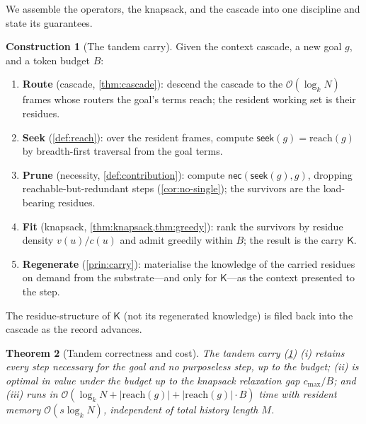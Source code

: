 \documentclass[11pt,twocolumn,a4paper]{article}
\theoremstyle{thmstyle}
\newtheorem{theorem}{Theorem}[section]
\theoremstyle{definition}
\newtheorem{construction}[theorem]{Construction}
\theoremstyle{remark}
\newcommand{\goal}{g}                   %
\newcommand{\reach}{\mathrm{reach}}
\newcommand{\keep}{\mathsf{K}}
\newcommand{\budget}{B}
\newcommand{\seek}{\textsf{seek}}
\newcommand{\nec}{\textsf{nec}}
\newcommand{\val}{v}                    %
\newcommand{\cost}{c}                   %
\newcommand{\abs}[1]{\lvert#1\rvert}
\begin{document}
We assemble the operators, the knapsack, and the cascade into one discipline and
state its guarantees.

\begin{construction}[The tandem carry]
\label{con:tandem}
Given the context cascade, a new goal $\goal$, and a token budget $\budget$:
\begin{enumerate}[leftmargin=1.8em,itemsep=1pt]
\item \textbf{Route} (cascade, \cref{thm:cascade}): descend the cascade to the
$\mathcal{O}(\log_k N)$ frames whose routers the goal's terms reach; the resident
working set is their residues.
\item \textbf{Seek} (\cref{def:reach}): over the resident frames, compute
$\seek(\goal)=\reach(\goal)$ by breadth-first traversal from the goal terms.
\item \textbf{Prune} (necessity, \cref{def:contribution}): compute
$\nec(\seek(\goal),\goal)$, dropping reachable-but-redundant steps
(\cref{cor:no-single}); the survivors are the load-bearing residues.
\item \textbf{Fit} (knapsack, \cref{thm:knapsack,thm:greedy}): rank the survivors
by residue density $\val(u)/\cost(u)$ and admit greedily within $\budget$; the
result is the carry $\keep$.
\item \textbf{Regenerate} (\cref{prin:carry}): materialise the knowledge of the
carried residues on demand from the substrate---and only for $\keep$---as the
context presented to the step.
\end{enumerate}
The residue-structure of $\keep$ (not its regenerated knowledge) is filed back
into the cascade as the record advances.
\end{construction}

\begin{theorem}[Tandem correctness and cost]
\label{thm:tandem}
The tandem carry (\cref{con:tandem}) (i) retains every step necessary for the
goal and no purposeless step, up to the budget; (ii) is optimal in value under
the budget up to the knapsack relaxation gap $\cost_{\max}/\budget$; and (iii)
runs in $\mathcal{O}(\log_k N + \abs{\reach(\goal)} + \abs{\reach(\goal)}\cdot\budget)$
time with resident memory $\mathcal{O}(s\log_k N)$, independent of total history
length $M$.
\end{theorem}
\end{document}
